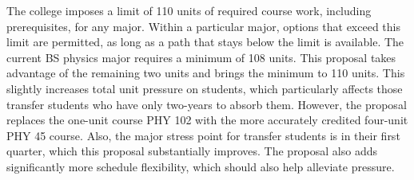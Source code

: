 \documentclass[12pt]{article}
\begin{document}
The college imposes a limit of 110 units of required course work,
including prerequisites, for any major.  Within a particular major,
options that exceed this limit are permitted, as long as a path that
stays below the limit is available.  The current BS physics major
requires a minimum of 108 units.  This proposal takes advantage of the
remaining two units and brings the minimum to 110 units.  This
slightly increases total unit pressure on students, which particularly
affects those transfer students who have only two-years to absorb
them.  However, the proposal replaces the one-unit course PHY 102 with
the more accurately credited four-unit PHY 45 course.  Also, the major
stress point for transfer students is in their first quarter, which
this proposal substantially improves.  The proposal also adds
significantly more schedule flexibility, which should also help
alleviate pressure.

\newpage
\end{document}
